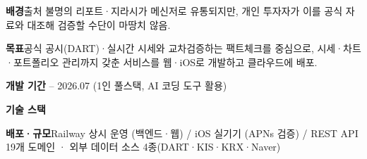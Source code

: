 

\begin{cvitems}
  \item {\textbf{배경}\enskip 출처 불명의 리포트·지라시가 메신저로 유통되지만, 개인 투자자가 이를 공식 자료와 대조해 검증할 수단이 마땅치 않음.}
  \item {\textbf{목표}\enskip 공식 공시(DART)·실시간 시세와 교차검증하는 팩트체크를 중심으로, 시세·차트·포트폴리오 관리까지 갖춘 서비스를 웹·iOS로 개발하고 클라우드에 배포.}
  \item {\textbf{개발 기간} -- 2026.07 (1인 풀스택, AI 코딩 도구 활용)}
  \item {\textbf{기술 스택}\enskip {}         }
  \item {\textbf{배포·규모}\enskip Railway 상시 운영 (백엔드·웹) / iOS 실기기 (APNs 검증) / REST API 19개 도메인 · 외부 데이터 소스 4종(DART·KIS·KRX·Naver)}
\end{cvitems}


\newpage



